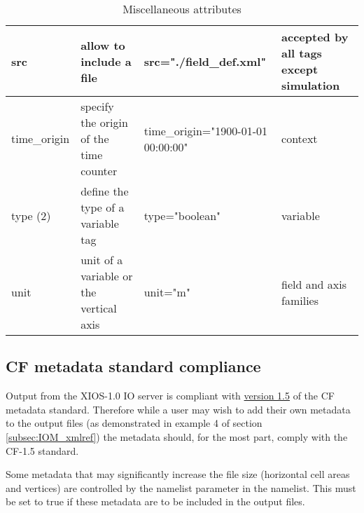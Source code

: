 \documentclass[../main/NEMO_manual]{subfiles}
\begin{document}
\begin{table}
\begin{tabularx}{\textwidth}{|l|X|X|X|}
    \hline
    src                                                                                                  &
    allow to include a file                                                                              &
    src="./field\_def.xml"                                                                               &
    accepted by all tags except simulation \\
    \hline
    time\_origin                                                                                         &
    specify the origin of the time counter                                                               &
    time\_origin="1900-01-01 00:00:00"                                                                   &
    context                                \\
    \hline
    type (2)                                                                                             &
    define the type of a variable tag                                                                    &
    type="boolean"                                                                                       &
    variable                               \\
    \hline
    unit                                                                                                 &
    unit of a variable or the vertical axis                                                              &
    unit="m"                                                                                             &
    field and axis families                \\
    \hline
  \end{tabularx}
  \caption{Miscellaneous attributes}
\end{table}

\subsection{CF metadata standard compliance}

Output from the XIOS-1.0 IO server is compliant with 
\href{http://cfconventions.org/Data/cf-conventions/cf-conventions-1.5/build/cf-conventions.html}{version 1.5} of
the CF metadata standard. 
Therefore while a user may wish to add their own metadata to the output files (as demonstrated in example 4 of
section \autoref{subsec:IOM_xmlref}) the metadata should, for the most part, comply with the CF-1.5 standard.

Some metadata that may significantly increase the file size (horizontal cell areas and vertices) are controlled by
the namelist parameter  in the  namelist.
This must be set to true if these metadata are to be included in the output files.
\end{document}
